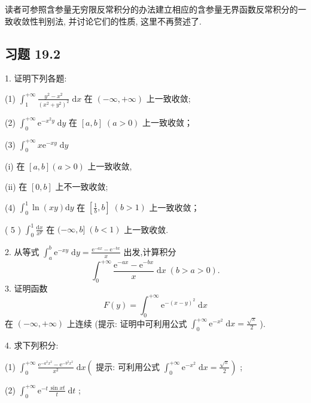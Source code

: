 读者可参照含参量无穷限反常积分的办法建立相应的含参量无界函数反常积分的一致收敛性判别法, 并讨论它们的性质, 这里不再赘述了.



\subsection{习题 19.2}

1. 证明下列各题:

(1) \({\int }_{1}^{+\infty }\frac{{y}^{2} - {x}^{2}}{{\left( {x}^{2} + {y}^{2}\right) }^{2}}\mathrm{\;d}x\) 在 \(\left( {-\infty , + \infty }\right)\) 上一致收敛;

(2) \({\int }_{0}^{+\infty }{\mathrm{e}}^{-{x}^{2}y}\mathrm{\;d}y\) 在 \(\left\lbrack  {a,b}\right\rbrack  \;\left( {a > 0}\right)\) 上一致收敛；

(3) \({\int }_{0}^{+\infty }x{\mathrm{e}}^{-{xy}}\mathrm{\;d}y\)

(i) 在 \(\left\lbrack  {a,b}\right\rbrack  \left( {a > 0}\right)\) 上一致收敛,

(ii) 在 \(\left\lbrack  {0,b}\right\rbrack\) 上不一致收敛;

(4) \({\int }_{0}^{1}\ln \left( {xy}\right) \mathrm{d}y\) 在 \(\left\lbrack  {\frac{1}{b},b}\right\rbrack  \;\left( {b > 1}\right)\) 上一致收敛；

( 5 ) \({\int }_{0}^{1}\frac{\mathrm{d}x}{{x}^{p}}\) 在 \(( - \infty ,b\rbrack \;\left( {b < 1}\right)\) 上一致收敛.

2. 从等式 \({\int }_{a}^{b}{\mathrm{e}}^{-{xy}}\mathrm{\;d}y = \frac{{\mathrm{e}}^{-{ax}} - {\mathrm{e}}^{-{bx}}}{x}\) 出发,计算积分
\[
{\int }_{0}^{+\infty }\frac{{\mathrm{e}}^{-{ax}} - {\mathrm{e}}^{-{bx}}}{x}\mathrm{\;d}x\;\left( {b > a > 0}\right) .
\]
3. 证明函数
\[
F\left( y\right)  = {\int }_{0}^{+\infty }{\mathrm{e}}^{-{\left( x - y\right) }^{2}}\mathrm{\;d}x
\]
在 \(\left( {-\infty , + \infty }\right)\) 上连续 (提示: 证明中可利用公式 \({\int }_{0}^{+\infty }{\mathrm{e}}^{-{x}^{2}}\mathrm{\;d}x = \frac{\sqrt{\pi }}{2}\) ).

4. 求下列积分:

(1) \({\int }_{0}^{+\infty }\frac{{\mathrm{e}}^{-{a}^{2}{x}^{2}} - {\mathrm{e}}^{-{b}^{2}{x}^{2}}}{{x}^{2}}\mathrm{\;d}x\left( \right.\) 提示: 可利用公式 \(\left. {{\int }_{0}^{+\infty }{\mathrm{e}}^{-{x}^{2}}\mathrm{\;d}x = \frac{\sqrt{\pi }}{2}}\right)\) ;

(2) \({\int }_{0}^{+\infty }{\mathrm{e}}^{-t}\frac{\sin {xt}}{t}\mathrm{\;d}t\) ;

